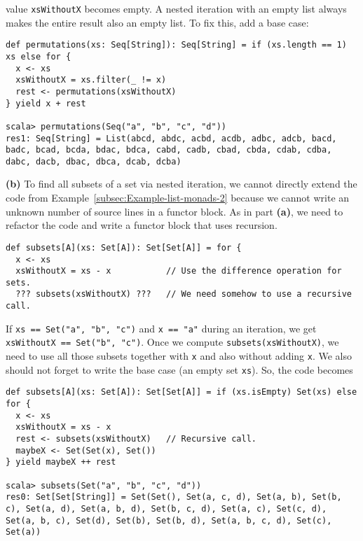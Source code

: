 value \lstinline!xsWithoutX! becomes empty. A nested iteration with
an empty list always makes the entire result also an empty list. To
fix this, add a base case:
\begin{lstlisting}
def permutations(xs: Seq[String]): Seq[String] = if (xs.length == 1) xs else for {
  x <- xs
  xsWithoutX = xs.filter(_ != x)
  rest <- permutations(xsWithoutX)
} yield x + rest

scala> permutations(Seq("a", "b", "c", "d"))
res1: Seq[String] = List(abcd, abdc, acbd, acdb, adbc, adcb, bacd, badc, bcad, bcda, bdac, bdca, cabd, cadb, cbad, cbda, cdab, cdba, dabc, dacb, dbac, dbca, dcab, dcba) 
\end{lstlisting}

\textbf{(b)} To find all subsets of a set via nested iteration, we
cannot directly extend the code from Example~\ref{subsec:Example-list-monads-2}
because we cannot write an unknown number of source lines in a functor
block. As in part \textbf{(a)}, we need to refactor the code and write
a functor block that uses recursion.
\begin{lstlisting}
def subsets[A](xs: Set[A]): Set[Set[A]] = for {
  x <- xs
  xsWithoutX = xs - x           // Use the difference operation for sets.
  ??? subsets(xsWithoutX) ???   // We need somehow to use a recursive call.
\end{lstlisting}
If \lstinline!xs == Set("a", "b", "c")! and \lstinline!x == "a"!
during an iteration, we get \lstinline!xsWithoutX == Set("b", "c")!.
Once we compute \lstinline!subsets(xsWithoutX)!, we need to use all
those subsets together with \lstinline!x! and also without adding
\lstinline!x!. We also should not forget to write the base case (an
empty set \lstinline!xs!). So, the code becomes
\begin{lstlisting}
def subsets[A](xs: Set[A]): Set[Set[A]] = if (xs.isEmpty) Set(xs) else for {
  x <- xs
  xsWithoutX = xs - x
  rest <- subsets(xsWithoutX)   // Recursive call.
  maybeX <- Set(Set(x), Set())
} yield maybeX ++ rest

scala> subsets(Set("a", "b", "c", "d"))
res0: Set[Set[String]] = Set(Set(), Set(a, c, d), Set(a, b), Set(b, c), Set(a, d), Set(a, b, d), Set(b, c, d), Set(a, c), Set(c, d), Set(a, b, c), Set(d), Set(b), Set(b, d), Set(a, b, c, d), Set(c), Set(a)) 
\end{lstlisting}

